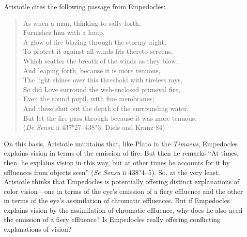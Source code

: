 Aristotle cites the following passage from Empedocles:
\begin{verse}
	As when a man, thinking to sally forth,\\
	Furnishes him with a lamp,\\
	A glow of fire blazing through the stormy night,\\
	To protect it against all winds fits thereto screens,\\
	Which scatter the breath of the winds as they blow;\\
	And leaping forth, because it is more tenuous,\\
	The light shines over this threshold with tireless rays,\\
	So did Love surround the web-enclosed primeval fire,\\
	Even the round pupil, with fine membranes;\\
	And these shut out the depth of the surrounding water,\\
	But let the fire pass through because it was more tenuous.\\
	(\emph{De Sensu} \textsc{ii} 437\( ^{b} \)27--438\( ^{a} \)3; Diels and Kranz 84)
\end{verse}
On this basis, Aristotle maintains that, like Plato in the \emph{Timaeus}, Empedocles explains vision in terms of the emission of fire. But then he remarks ``At times, then, he explains vision in this way, but at other times he accounts for it by effluences from objects seen'' (\emph{Se Sensu} \textsc{ii} 438\( ^{a} \)4--5). So, at the very least, Aristotle thinks that Empedocles is potentially offering distinct explanations of color vision---one in terms of the eye's emission of a fiery effluence and the other in terms of the eye's assimilation of chromatic effluences. But if Empedocles explains vision by the assimilation of chromatic effluence, why does he also need the emission of a fiery effluence? Is Empedocles really offering conflicting explanations of vision? 

